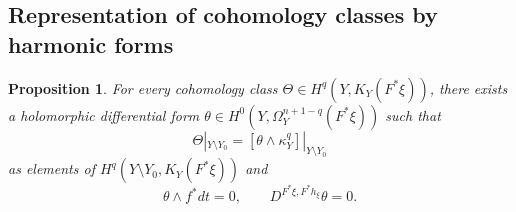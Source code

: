 \documentclass[amscd, leqno]{amsart}
\theoremstyle{plain}
\newtheorem{proposition}[theorem]{Proposition}
\theoremstyle{definition}
\theoremstyle{remark}
\begin{document}
\subsection
{Representation of cohomology classes by harmonic forms}
\label{sect:4.3}
\par


\begin{proposition}
\label{Proposition:Takegoshi}
For every cohomology class $\Theta\in H^{q}(Y, K_{Y}(F^{*}\xi))$, 
there exists a holomorphic differential form $\theta\in H^{0}(Y,\Omega_{Y}^{n+1-q}(F^{*}\xi))$ such that
$$
\Theta|_{Y\setminus Y_{0}}=[\theta\wedge\kappa_{Y}^{q}]|_{Y\setminus Y_{0}}
$$
as elements of $H^{q}(Y\setminus Y_{0}, K_{Y}(F^{*}\xi))$ and
$$
\theta\wedge f^{*}dt=0,
\qquad
D^{F^{*}\xi, F^{*}h_{\xi}}\theta =0.
$$
\end{proposition}
\end{document}
